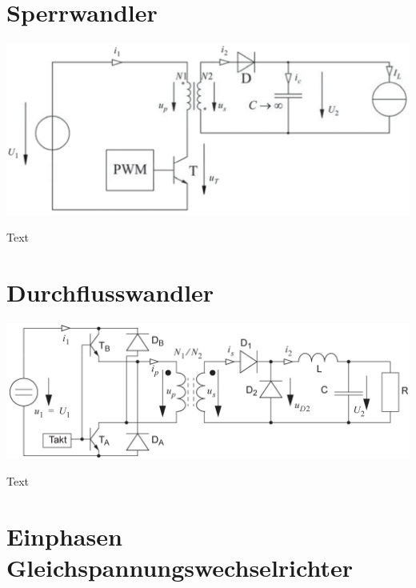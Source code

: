 \documentclass[10pt,landscape]{scrartcl}
\begin{document}
\begin{multicols}{2}
\vfill\null
\columnbreak
\section{Sperrwandler}

\begin{center}
\includegraphics[width=0.8\linewidth]{img/sch_sperr.png}%
\end{center}

Text

\vfill\null
\columnbreak
\section{Durchflusswandler}

\begin{center}
\includegraphics[width=0.8\linewidth]{img/sch_durchfluss.png}%
\end{center}

Text

\vfill\null
\columnbreak
\section{Einphasen Gleichspannungswechselrichter}


\end{multicols}
\end{document}
